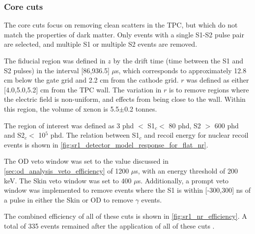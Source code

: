 \subsubsection{Core cuts}
The core cuts focus on removing clean scatters in the TPC, but which do not match the properties of dark matter.
Only events with a single S1-S2 pulse pair are selected, and multiple S1 or multiple S2 events are removed.
\par
The fiducial region was defined in $z$ by the drift time (time between the S1 and S2 pulses) in the interval [86,936.5] $\mu$s, which corresponds to approximately 12.8 cm below the gate grid and 2.2 cm from the cathode grid.
$r$ was defined as either [4.0,5.0,5.2] cm from the TPC wall. 
The variation in $r$ is to remove regions where the electric field is non-uniform, and effects from being close to the wall.
Within this region, the volume of xenon is 5.5$\pm$0.2 tonnes.
\par
The region of interest was defined as 3 phd $<$ S1$_c <$ 80 phd, S2 $>$ 600 phd and S2$_c <$ 10$^5$ phd.
The relation between S1$_c$ and recoil energy for nuclear recoil events is shown in \autoref{fig:sr1_detector_model_response_for_flat_nr}.
\par
The OD veto window was set to the value discussed in \autoref{sec:od_analysis_veto_efficiency} of 1200 $\mu$s, with an energy threshold of 200 keV.
The Skin veto window was set to 400 $\mu$s.
Additionally, a prompt veto window was implemented to remove events where the S1 is within [-300,300] ns of a pulse in either the Skin or OD to remove $\gamma$ events.

\par
The combined efficiency of all of these cuts is shown in \autoref{fig:sr1_nr_efficiency}.
A total of 335 events remained after the application of all of these cuts \cite{lz_ws_sr1_ref}.


